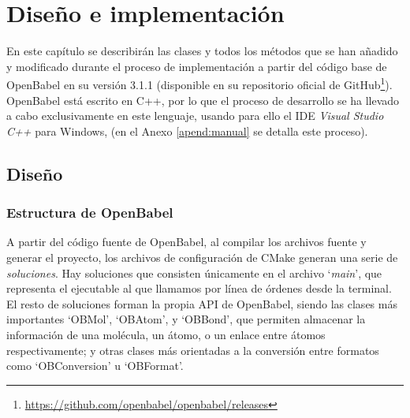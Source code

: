 \chapter{Diseño e implementación}

En este capítulo se describirán las clases y todos los métodos que se han añadido y modificado durante el proceso de implementación a partir del código base de OpenBabel en su versión 3.1.1 (disponible en su repositorio oficial de GitHub\footnote{\url{https://github.com/openbabel/openbabel/releases}}). OpenBabel está escrito en C++, por lo que el proceso de desarrollo se ha llevado a cabo exclusivamente en este lenguaje, usando para ello el IDE \textit{Visual Studio C++} para Windows, (en el Anexo \ref{apend:manual} se detalla este proceso).


\section{Diseño}

\subsection{Estructura de OpenBabel}

A partir del código fuente de OpenBabel, al compilar los archivos fuente y generar el proyecto, los archivos de configuración de CMake generan una serie de \emph{soluciones}. Hay soluciones que consisten únicamente en el archivo `\textit{main}', que representa el ejecutable al que llamamos por línea de órdenes desde la terminal. El resto de soluciones forman la propia API de OpenBabel, siendo las clases más importantes `OBMol', `OBAtom', y `OBBond', que permiten almacenar la información de una molécula, un átomo, o un enlace entre átomos respectivamente; y otras clases más orientadas a la conversión entre formatos como `OBConversion' u `OBFormat'.

